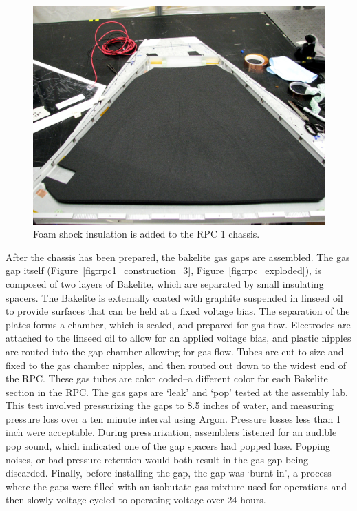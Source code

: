 \begin{figure}
  \centering
  \includegraphics[width=0.7\linewidth]{./figures/rpc1_construction_2}
  \caption{
    Foam shock insulation is added to the RPC 1 chassis.
  }
  \label{fig:rpc1_construction_2}
\end{figure}

After the chassis has been prepared, the bakelite gas gaps are assembled. The
gas gap itself (Figure~\ref{fig:rpc1_construction_3},
Figure~\ref{fig:rpc_exploded}), is composed of two layers of Bakelite, which are
separated by small insulating spacers. The Bakelite is externally coated with
graphite suspended in linseed oil to provide surfaces that can be held at a
fixed voltage bias. The separation of the plates forms a chamber, which is
sealed, and prepared for gas flow.  Electrodes are attached to the linseed oil
to allow for an applied voltage bias, and plastic nipples are routed into the
gap chamber allowing for gas flow. Tubes are cut to size and fixed to the gas
chamber nipples, and then routed out down to the widest end of the RPC. These
gas tubes are color coded--a different color for each Bakelite section in the
RPC.  The gas gaps are `leak' and `pop' tested at the assembly lab.  This test
involved pressurizing the gaps to 8.5 inches of water, and measuring pressure
loss over a ten minute interval using Argon. Pressure losses less than 1 inch
were acceptable. During pressurization, assemblers listened for an audible pop
sound, which indicated one of the gap spacers had popped lose. Popping noises,
or bad pressure retention would both result in the gas gap being discarded.
Finally, before installing the gap, the gap was `burnt in', a process where the
gaps were filled with an isobutate gas mixture used for operations and then slowly voltage cycled
to operating voltage over 24 hours.

